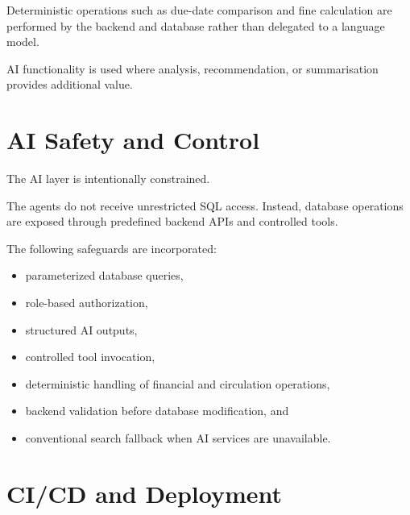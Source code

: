 \documentclass{tietreport}
\begin{document}
Deterministic operations such as due-date comparison and fine calculation
are performed by the backend and database rather than delegated to a
language model.

AI functionality is used where analysis, recommendation, or summarisation
provides additional value.


\section{AI Safety and Control}

The AI layer is intentionally constrained.

The agents do not receive unrestricted SQL access. Instead, database
operations are exposed through predefined backend APIs and controlled
tools.

The following safeguards are incorporated:

\begin{itemize}

    \item parameterized database queries,

    \item role-based authorization,

    \item structured AI outputs,

    \item controlled tool invocation,

    \item deterministic handling of financial and circulation operations,

    \item backend validation before database modification, and

    \item conventional search fallback when AI services are unavailable.

\end{itemize}


\section{CI/CD and Deployment}
\end{document}
